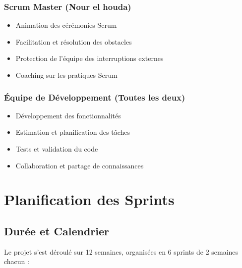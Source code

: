 \subsubsection{Scrum Master (Nour el houda)}
\begin{itemize}
    \item Animation des cérémonies Scrum
    \item Facilitation et résolution des obstacles
    \item Protection de l'équipe des interruptions externes
    \item Coaching sur les pratiques Scrum
\end{itemize}

\subsubsection{Équipe de Développement (Toutes les deux)}
\begin{itemize}
    \item Développement des fonctionnalités
    \item Estimation et planification des tâches
    \item Tests et validation du code
    \item Collaboration et partage de connaissances
\end{itemize}

\section{Planification des Sprints}

\subsection{Durée et Calendrier}

Le projet s'est déroulé sur 12 semaines, organisées en 6 sprints de 2 semaines chacun :

